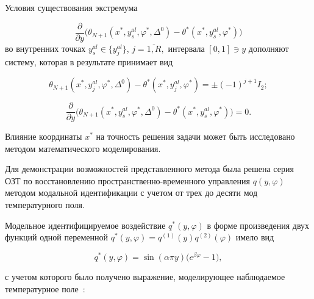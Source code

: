 Условия существования экстремума 

$$\frac{\partial }{\partial y}\bigl( \theta _{N + 1}( x^*,y_s^{al},\varphi ^*,\Delta ^0 ) - {\theta ^*}(x^*,y_s^{al},\varphi ^*) \bigr)$$ во внутренних точках $y_s^{al} \in \{ y_j^{al} \}$, $j = \overline {1,R}, $  интервала $[ 0,1 ] \ni y$ дополняют систему, которая в результате принимает вид

\begin{equation}\label{eq:ulg:Alternance_System}

\theta _{N + 1}( x^*,y_j^{al},\varphi ^*,\Delta ^0 ) - \theta ^*(x^*,y_j^{al},\varphi ^*) =  \pm {( - 1)^{j + 1}}{I_2};

\end{equation}

\begin{equation}\label{eq:ulg:Alternance_System_Derivative}

\frac{\partial }{\partial y}\bigl( \theta _{N + 1}( x^*,y_s^{al},\varphi ^*,\Delta ^0 ) - \theta ^*(x^*,y_s^{al},\varphi ^*) \bigr) = 0.

\end{equation}



Влияние координаты $x^*$ на точность решения задачи может быть исследовано методом математического моделирования. 



\smallskip




Для демонстрации возможностей представленного метода была решена серия ОЗТ по восстановлению пространственно-временного управления $ q(y,\varphi ) $  методом модальной идентификации с учетом от трех до десяти мод температурного поля.

Модельное идентифицируемое воздействие $ q^*(y,\varphi )$ в форме произведения двух функций одной переменной $ q^*(y,\varphi ) = q^{(1)}(y)q^{(2)}(\varphi ) $  имело вид

\begin{equation}\label{eq:ulg:Seeking control}

q^*(y,\varphi ) = \sin (\alpha \pi y)\bigl( e^{\beta \varphi } - 1 \bigr),

\end{equation}

с учетом которого было получено выражение, моделирующее наблюдаемое температурное поле~\cite{ulg:bib:Koshlyakov_Gliner_Smirnov}:

